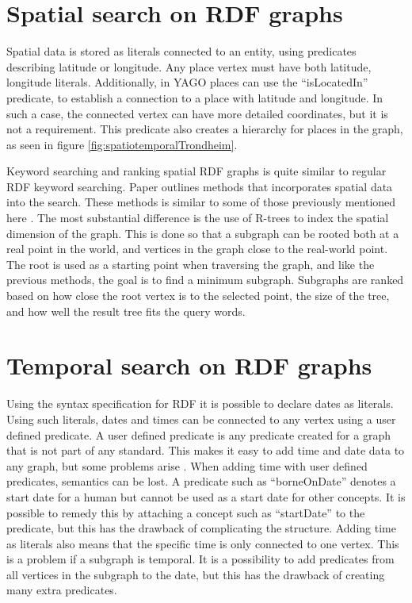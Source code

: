 \section{Spatial search on RDF graphs}
Spatial data is stored as literals connected to an entity, using predicates describing latitude or longitude. Any place vertex must have both latitude, longitude literals. Additionally, in YAGO places can use the ``isLocatedIn'' predicate\cite{hoffart2013yago2}, to establish a connection to a place with latitude and longitude. In such a case, the connected vertex can have more detailed coordinates, but it is not a requirement. This predicate also creates a hierarchy for places in the graph, as seen in figure \ref{fig:spatiotemporalTrondheim}.

Keyword searching and ranking spatial RDF graphs is quite similar to regular RDF keyword searching. Paper \cite{Shi:2016:TRS:2882903.2882941} outlines methods that incorporates spatial data into the search. These methods is similar to some of those previously mentioned here \cite{4812421, Elbassuoni:2011:KSO:2063576.2063615}. The most substantial difference is the use of R-trees to index the spatial dimension of the graph. This is done so that a subgraph can be rooted both at a real point in the world, and vertices in the graph close to the real-world point. The root is used as a starting point when traversing the graph, and like the previous methods, the goal is to find a minimum subgraph. Subgraphs are ranked based on how close the root vertex is to the selected point, the size of the tree, and how well the result tree fits the query words.

\section{Temporal search on RDF graphs}
Using the syntax specification for RDF \cite{beckett2004rdf} it is possible to declare dates as literals. Using such literals, dates and times can be connected to any vertex using a user defined predicate. A user defined predicate is any predicate created for a graph that is not part of any standard. This makes it easy to add time and date data to any graph, but some problems arise \cite{tappolet2009applied}. When adding time with user defined predicates, semantics can be lost. A predicate such as ``borneOnDate'' denotes a start date for a human but cannot be used as a start date for other concepts. It is possible to remedy this by attaching a concept such as ``startDate'' to the predicate, but this has the drawback of complicating the structure. Adding time as literals also means that the specific time is only connected to one vertex. This is a problem if a subgraph is temporal. It is a possibility to add predicates from all vertices in the subgraph to the date, but this has the drawback of creating many extra predicates.

